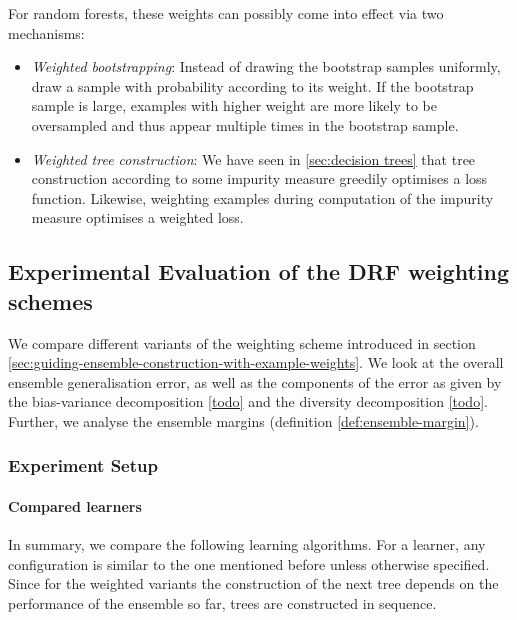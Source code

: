\documentclass[../main.tex]{subfiles}
\begin{document}
For random forests, these weights can possibly come into effect via two mechanisms:
\begin{itemize}
    \item \textit{Weighted bootstrapping}: Instead of drawing the bootstrap samples uniformly, draw a sample with probability according to its weight. If the bootstrap sample is large, examples with higher weight are more likely to be oversampled and thus appear multiple times in the bootstrap sample. 
    \item \textit{Weighted tree construction}: We have seen in \ref{sec:decision trees} that tree construction according to some impurity measure greedily optimises a loss function. Likewise, weighting examples during computation of the impurity measure optimises a weighted loss.
\end{itemize}


\subsection{Experimental Evaluation of the DRF weighting schemes}

We compare different variants of the weighting scheme introduced in section \ref{sec:guiding-ensemble-construction-with-example-weights}. We look at the overall ensemble generalisation error, as well as the components of the error as given by the bias-variance decomposition \ref{todo} and the diversity decomposition \ref{todo}. Further, we analyse the ensemble margins (definition \ref{def:ensemble-margin}).

\subsubsection{Experiment Setup}
\label{sec:experiment-setup}



\paragraph{Compared learners} In summary, we compare the following learning algorithms. For a learner, any configuration is similar to the one mentioned before unless otherwise specified. Since for the weighted variants the construction of the next tree depends on the performance of the ensemble so far, trees are constructed in sequence.
\end{document}
